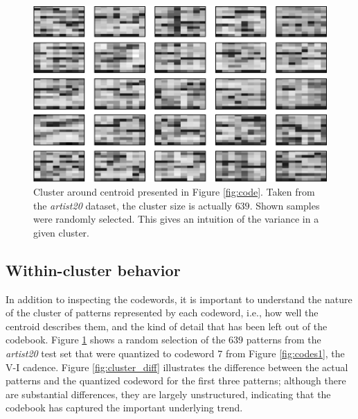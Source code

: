 \documentclass{article}
\newcommand{\ie}{i.e.~}
\begin{document}
\begin{figure}[t]
\begin{center}
\includegraphics[width=.95\columnwidth]{close_patterns1}
\end{center}
\caption{\small{Cluster around centroid presented in
Figure \ref{fig:code}. Taken from the {\it artist20} dataset, the cluster
size is actually $639$. Shown samples were randomly selected.
This gives an intuition of the variance
in a given cluster.
}}
\label{fig:cluster}
\end{figure}

\subsection{Within-cluster behavior}
In addition to inspecting the codewords, it is important to understand 
the nature of the cluster of patterns represented by each codeword, i.e., 
how well the centroid describes them, and the kind of detail that has 
been left out of the codebook.  Figure \ref{fig:cluster} shows a random 
selection of the $639$ patterns from the {\it artist20} test set that 
were quantized to codeword 7 from Figure \ref{fig:codes1}, the V-I cadence. 
Figure \ref{fig:cluster_diff} illustrates the difference between the actual 
patterns and the quantized codeword for the first three patterns; although 
there are substantial differences, they are largely unstructured, indicating 
that the codebook has captured the important underlying trend.

\end{document}
